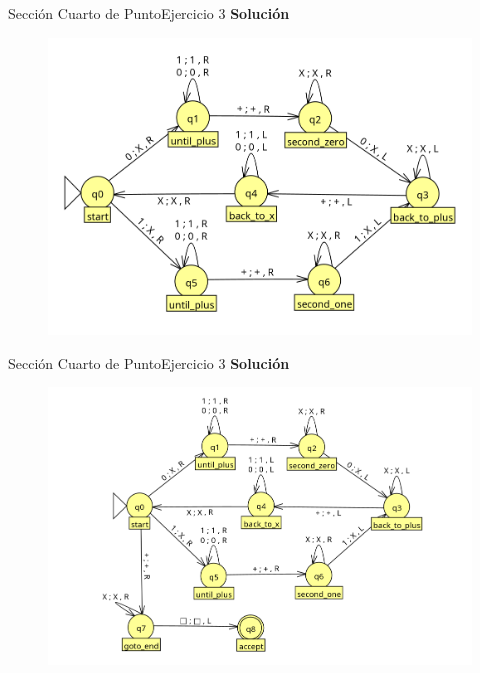\documentclass[10pt, envcountsect, presentation, aspectratio=169]{beamer}
\begin{document}
\begin{frame}{Sección Cuarto de Punto}{Ejercicio 3}
    \textbf{Solución}\\
    \begin{figure}
        \includegraphics[scale=0.25]{images/mct1ej3_3.png}
    \end{figure}
\end{frame}


\begin{frame}{Sección Cuarto de Punto}{Ejercicio 3}
    \textbf{Solución}\\
    \begin{figure}
        \includegraphics[scale=0.25]{images/mct1ej3_4.png}
    \end{figure}
\end{frame}
\end{document}
